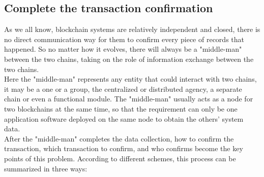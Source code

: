 %    


\subsection{Complete the transaction confirmation}
\noindent As we all know, blockchain systems are relatively independent and closed, there is no direct communication way for them to confirm every piece of records that happened. So no matter how it evolves, there will always be a "middle-man" between the two chains, taking on the role of information exchange between the two chains.\\

\noindent Here the "middle-man" represents any entity that could interact with two chains, it may be a one or a group, the centralized or distributed agency, a separate chain or even a functional module. The "middle-man" usually acts as a node for two blockchains at the same time, so that the requirement can only be one application software deployed on the same node to obtain the others' system data.\\

\noindent After the "middle-man" completes the data collection, how to confirm the transaction, which transaction to confirm, and who confirms become the key points of this problem. According to different schemes, this process can be summarized in three ways:

